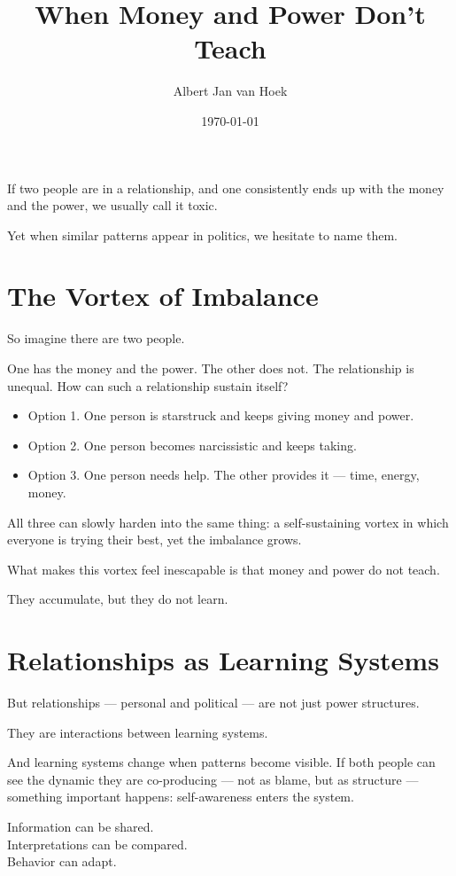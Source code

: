 \documentclass{article}
\title{When Money and Power Don’t Teach}
\author{Albert Jan van Hoek}
\date{\today}
\begin{document}
\maketitle

If two people are in a relationship, and one consistently ends up with the money and the power, we usually call it toxic.

Yet when similar patterns appear in politics, we hesitate to name them.

\section*{The Vortex of Imbalance}

So imagine there are two people.

One has the money and the power.
The other does not.
The relationship is unequal.
How can such a relationship sustain itself?

\begin{itemize}
    \item Option 1. One person is starstruck and keeps giving money and power.
    \item Option 2. One person becomes narcissistic and keeps taking.
    \item Option 3. One person needs help. The other provides it — time, energy, money.
\end{itemize}

All three can slowly harden into the same thing: a self-sustaining vortex in which everyone is trying their best, yet the imbalance grows.

What makes this vortex feel inescapable is that money and power do not teach.

They accumulate, but they do not learn.

\section*{Relationships as Learning Systems}

But relationships — personal and political — are not just power structures.

They are interactions between learning systems.

And learning systems change when patterns become visible.
If both people can see the dynamic they are co-producing — not as blame, but as structure — something important happens: self-awareness enters the system.

Information can be shared. \\
Interpretations can be compared. \\
Behavior can adapt.
\end{document}
